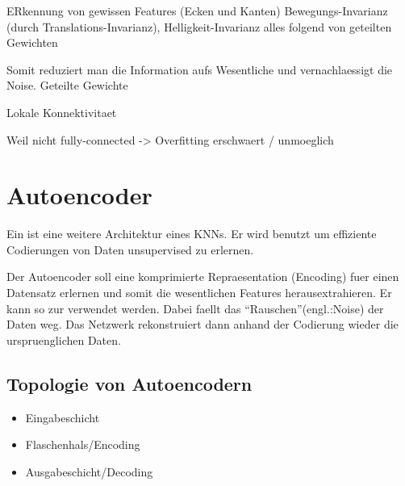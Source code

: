 ERkennung von gewissen Features (Ecken und Kanten)
Bewegungs-Invarianz (durch Translations-Invarianz), Helligkeit-Invarianz
alles folgend von geteilten Gewichten

Somit reduziert man die Information aufs Wesentliche und vernachlaessigt die Noise.
Geteilte Gewichte

Lokale Konnektivitaet

Weil nicht fully-connected -> Overfitting erschwaert / unmoeglich


\pagebreak
\section{Autoencoder}
Ein  ist eine weitere Architektur eines KNNs. Er wird
benutzt um effiziente Codierungen von Daten unsupervised zu erlernen.

Der Autoencoder soll eine komprimierte Repraesentation (Encoding) fuer einen
Datensatz erlernen und somit die wesentlichen Features herausextrahieren. Er
kann so zur  verwendet werden. Dabei faellt
das ``Rauschen''(engl.:Noise) der Daten weg. Das Netzwerk rekonstruiert dann
anhand der Codierung wieder die urspruenglichen Daten.



\subsection{Topologie von Autoencodern}

\begin{itemize}
\item{Eingabeschicht}
\item{Flaschenhals/Encoding}
\item{Ausgabeschicht/Decoding}
\end{itemize}

